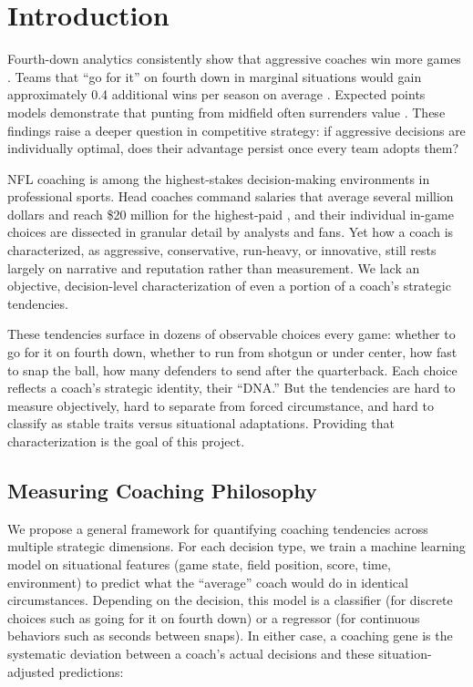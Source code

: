 \documentclass[USenglish]{article}
\theoremstyle{dgthm}
\theoremstyle{dgdef}
\begin{document}
\section{Introduction}

Fourth-down analytics consistently show that aggressive coaches win more games \citep{romer2006,yam2019}. Teams that ``go for it'' on fourth down in marginal situations would gain approximately 0.4 additional wins per season on average \citep{yam2019}. Expected points models demonstrate that punting from midfield often surrenders value \citep{burke2009}. These findings raise a deeper question in competitive strategy: if aggressive decisions are individually optimal, does their advantage persist once every team adopts them? 

NFL coaching is among the highest-stakes decision-making environments in professional sports. Head coaches command salaries that average several million dollars and reach \$20 million for the highest-paid \citep{sportico2024}, and their individual in-game choices are dissected in granular detail by analysts and fans. Yet how a coach is characterized, as aggressive, conservative, run-heavy, or innovative, still rests largely on narrative and reputation rather than measurement. We lack an objective, decision-level characterization of even a portion of a coach's strategic tendencies.

These tendencies surface in dozens of observable choices every game: whether to go for it on fourth down, whether to run from shotgun or under center, how fast to snap the ball, how many defenders to send after the quarterback. Each choice reflects a coach's strategic identity, their ``DNA.'' But the tendencies are hard to measure objectively, hard to separate from forced circumstance, and hard to classify as stable traits versus situational adaptations. Providing that characterization is the goal of this project.

\subsection{Measuring Coaching Philosophy}

We propose a general framework for quantifying coaching tendencies across multiple strategic dimensions. For each decision type, we train a machine learning model on situational features (game state, field position, score, time, environment) to predict what the ``average'' coach would do in identical circumstances. Depending on the decision, this model is a classifier (for discrete choices such as going for it on fourth down) or a regressor (for continuous behaviors such as seconds between snaps). In either case, a coaching gene is the systematic deviation between a coach's actual decisions and these situation-adjusted predictions:
\end{document}
